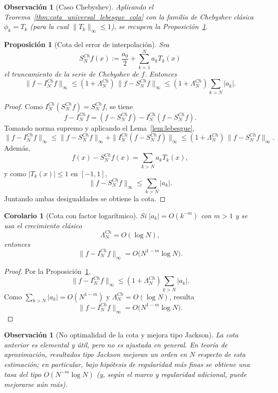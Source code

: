 \documentclass[a4paper,11pt]{report}
\newtheorem{corollary}[theorem]{Corolario}
\newtheorem{proposition}[theorem]{Proposición}
\newtheorem{remark}[theorem]{Observación}
\begin{document}
\begin{remark}[Caso Chebyshev]
Aplicando el Teorema~\ref{thm:cota_universal_lebesgue_cola} con la familia de Chebyshev clásica $\phi_k=T_k$ (para la cual $\|T_k\|_\infty\le1$), se recupera la Proposición~\ref{prop:error_interp_cheb_sin_aliasing}.
\end{remark}

\begin{proposition}[Cota del error de interpolación]\label{prop:error_interp_cheb_sin_aliasing}
Sea
\[
S_N^{Ch}f(x):=\frac{a_0}{2}+\sum_{k=1}^{N}a_kT_k(x)
\]
el truncamiento de la serie de Chebyshev de $f$. Entonces
\[
\|f-I_N^{Ch}f\|_\infty
\le (1+\Lambda_N^{Ch})\,\|f-S_N^{Ch}f\|_\infty
\le (1+\Lambda_N^{Ch})\sum_{k>N}|a_k|.
\]
\end{proposition}

\begin{proof}
Como $I_N^{Ch}(S_N^{Ch}f)=S_N^{Ch}f$, se tiene
\[
f-I_N^{Ch}f=(f-S_N^{Ch}f)-I_N^{Ch}(f-S_N^{Ch}f).
\]
Tomando norma supremo y aplicando el Lema~\ref{lem:lebesgue},
\[
\|f-I_N^{Ch}f\|_\infty
\le \|f-S_N^{Ch}f\|_\infty+\|I_N^{Ch}(f-S_N^{Ch}f)\|_\infty
\le (1+\Lambda_N^{Ch})\,\|f-S_N^{Ch}f\|_\infty.
\]
Además,
\[
f(x)-S_N^{Ch}f(x)=\sum_{k>N}a_kT_k(x),
\]
y como $|T_k(x)|\le1$ en $[-1,1]$,
\[
\|f-S_N^{Ch}f\|_\infty\le\sum_{k>N}|a_k|.
\]
Juntando ambas desigualdades se obtiene la cota.
\end{proof}

\begin{corollary}[Cota con factor logarítmico]\label{cor:error_interp_chebyshev_lebesgue}
Si $|a_k|=O(k^{-m})$ con $m>1$ y se usa el crecimiento clásico
\[
\Lambda_N^{Ch}=O(\log N),
\]
entonces
\[
\|f-I_N^{Ch}f\|_\infty=O\bigl(N^{1-m}\log N\bigr).
\]
\end{corollary}

\begin{proof}
Por la Proposición~\ref{prop:error_interp_cheb_sin_aliasing},
\[
\|f-I_N^{Ch}f\|_\infty
\le (1+\Lambda_N^{Ch})\sum_{k>N}|a_k|.
\]
Como $\sum_{k>N}|a_k|=O(N^{1-m})$ y $\Lambda_N^{Ch}=O(\log N)$, resulta
\[
\|f-I_N^{Ch}f\|_\infty=O\bigl(N^{1-m}\log N\bigr).
\]
\end{proof}

\begin{remark}[No optimalidad de la cota y mejora tipo Jackson]
La cota anterior es elemental y útil, pero no es ajustada en general. En teoría de aproximación, resultados tipo Jackson mejoran un orden en $N$ respecto de esta estimación; en particular, bajo hipótesis de regularidad más finas se obtiene una tasa del tipo $O(N^{-m}\log N)$ (y, según el marco y regularidad adicional, puede mejorarse aún más).
\end{remark}
\end{document}
